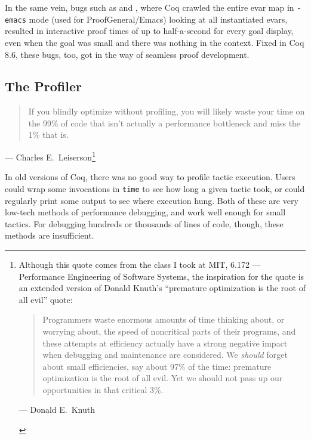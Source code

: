 In the same vein, bugs such as  and , where Coq crawled the entire evar map in \texttt{-emacs} mode (used for ProofGeneral/Emacs) looking at all instantiated evars, resulted in interactive proof times of up to half-a-second for every goal display, even when the goal was small and there was nothing in the context.
Fixed in Coq 8.6, these bugs, too, got in the way of seamless proof development.

\subsection{The \Ltac\space Profiler}\label{sec:ltac-prof}
\begin{quote}
  If you blindly optimize without profiling, you will likely waste your time on the 99\% of code that isn't actually a performance bottleneck and miss the 1\% that is.
\end{quote}
\begin{flushright}
  --- Charles E.~Leiserson\footnote{%
Although this quote comes from the class I took at MIT, 6.172 --- Performance Engineering of Software Systems, the inspiration for the quote is an extended version of Donald Knuth's ``premature optimization is the root of all evil'' quote:
\begin{quote}
  Programmers waste enormous amounts of time thinking about, or worrying about, the speed of noncritical parts of their programs, and these attempts at efficiency actually have a strong negative impact when debugging and maintenance are considered.
  We \emph{should} forget about small efficiencies, say about 97\% of the time: premature optimization is the root of all evil.
  Yet we should not pass up our opportunities in that critical 3\%.
\end{quote}
\begin{flushright}
  --- Donald E.~Knuth~\cite[p.~268]{KnuthPrematureOptimizationExtended}
\end{flushright}%
}%
~\cite{Profiling2020Leiserson}
\end{flushright}

In old versions of Coq, there was no good way to profile tactic execution.
Users could wrap some invocations in \texttt{time} to see how long a given tactic took, or could regularly print some output to see where execution hung.
Both of these are very low-tech methods of performance debugging, and work well enough for small tactics.
For debugging hundreds or thousands of lines of \Ltac\space code, though, these methods are insufficient.

